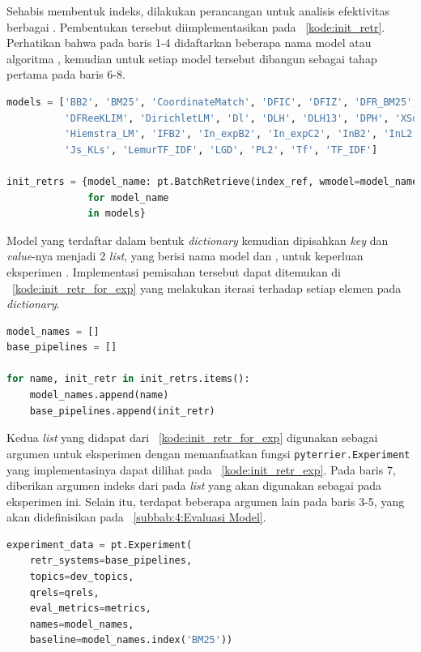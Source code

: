Sehabis membentuk indeks, dilakukan perancangan \pipeline{} untuk analisis efektivitas berbagai \base{} \retriever{}. Pembentukan \pipeline{} tersebut diimplementasikan pada \kode{}~\ref{kode:init_retr}. Perhatikan bahwa pada baris 1-4 didaftarkan beberapa nama model atau algoritma \base{} \retrieval{}, kemudian untuk setiap model tersebut dibangun \pipeline{} \retrieval{} sebagai tahap \ranking{} pertama pada baris 6-8.
\begin{lstlisting}[language=Python, caption={Pembentukan \textit{Base retriever pipelines}}, label={kode:init_retr}]
models = ['BB2', 'BM25', 'CoordinateMatch', 'DFIC', 'DFIZ', 'DFR_BM25', 'DFRee',
          'DFReeKLIM', 'DirichletLM', 'Dl', 'DLH', 'DLH13', 'DPH', 'XSqrA_M',
          'Hiemstra_LM', 'IFB2', 'In_expB2', 'In_expC2', 'InB2', 'InL2',
          'Js_KLs', 'LemurTF_IDF', 'LGD', 'PL2', 'Tf', 'TF_IDF']

init_retrs = {model_name: pt.BatchRetrieve(index_ref, wmodel=model_name)
              for model_name
              in models}
\end{lstlisting}

Model yang terdaftar dalam bentuk \textit{dictionary} kemudian dipisahkan \textit{key} dan \textit{value}-nya menjadi 2 \textit{list}, yang berisi nama model dan \pipeline{}, untuk keperluan eksperimen \retrieval{}. Implementasi pemisahan tersebut dapat ditemukan di \kode{}~\ref{kode:init_retr_for_exp} yang melakukan iterasi terhadap setiap elemen pada \textit{dictionary}.
\begin{lstlisting}[language=Python, caption={Persiapan \textit{base retriever pipelines} untuk Eksperimen}, label={kode:init_retr_for_exp}]
model_names = []
base_pipelines = []

for name, init_retr in init_retrs.items():
    model_names.append(name)
    base_pipelines.append(init_retr)
\end{lstlisting}

Kedua \textit{list} yang didapat dari \kode{}~\ref{kode:init_retr_for_exp} digunakan sebagai argumen untuk eksperimen dengan memanfaatkan fungsi \lstinline{pyterrier.Experiment} yang implementasinya dapat dilihat pada \kode{}~\ref{kode:init_retr_exp}. Pada baris 7, diberikan argumen indeks dari \obm{} pada \textit{list} yang akan digunakan sebagai \baseline{} pada eksperimen ini. Selain itu, terdapat beberapa argumen lain pada baris 3-5, yang akan didefinisikan pada \subbab{}~\ref{subbab:4:Evaluasi Model}.
\begin{lstlisting}[language=Python, caption={Eksperimen berbagai model atau algoritma \base{} \retrieval{}}, label={kode:init_retr_exp}]
experiment_data = pt.Experiment(
    retr_systems=base_pipelines,
    topics=dev_topics,
    qrels=qrels,
    eval_metrics=metrics,
    names=model_names,
    baseline=model_names.index('BM25'))
\end{lstlisting}

